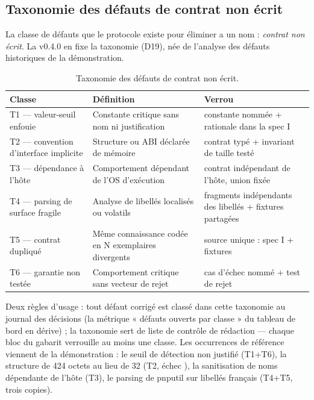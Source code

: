 \subsection{Taxonomie des défauts de contrat non écrit}\label{sec:taxonomie}

La classe de défauts que le protocole existe pour éliminer a un nom : \emph{contrat non
écrit}. La v0.4.0 en fixe la taxonomie (D19), née de l’analyse des défauts historiques de
la démonstration.

\begin{table}[htbp]
\centering\small
\caption{Taxonomie des défauts de contrat non écrit.}
\label{tab:taxonomie}
\begin{tabularx}{\textwidth}{@{}l Y Y@{}}
\toprule
\textbf{Classe} & \textbf{Définition} & \textbf{Verrou} \\
\midrule
T1 — valeur-seuil enfouie & Constante critique sans nom ni justification & constante
nommée + rationale dans la spec I \\
T2 — convention d’interface implicite & Structure ou ABI déclarée de mémoire & contrat
typé + invariant de taille testé \\
T3 — dépendance à l’hôte & Comportement dépendant de l’OS d’exécution & contrat
indépendant de l’hôte, union fixée \\
T4 — parsing de surface fragile & Analyse de libellés localisés ou volatils & fragments
indépendants des libellés + fixtures partagées \\
T5 — contrat dupliqué & Même connaissance codée en N exemplaires divergents & source
unique : spec I + fixtures \\
T6 — garantie non testée & Comportement critique sans vecteur de rejet & cas d’échec
nommé + test de rejet \\
\bottomrule
\end{tabularx}
\end{table}

Deux règles d’usage : tout défaut corrigé est classé dans cette taxonomie au journal des
décisions (la métrique « défauts ouverts par classe » du tableau de bord en dérive) ; la
taxonomie sert de liste de contrôle de rédaction — chaque bloc du gabarit verrouille au
moins une classe. Les occurrences de référence viennent de la démonstration : le seuil de
détection non justifié (T1+T6), la structure  de 424 octets au
lieu de 32 (T2, échec ), la sanitisation de noms dépendante de l’hôte (T3), le
parsing de pnputil sur libellés français (T4+T5, trois copies).

